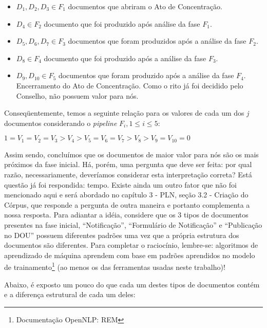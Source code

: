 \documentclass[11pt]{report}
\newcommand{\quotes}[1]{``#1''}
\begin{document}
\begin{itemize}
  \item $D_1, D_2, D_3 \in F_1$ documentos que abriram o Ato de Concentração.
  \item $D_4 \in F_2$ documento que foi produzido após análise da fase $F_1$.
  \item $D_5, D_6, D_7 \in F_3$ documentos que foram produzidos após a análise da fase $F_2$.
  \item $D_8 \in F_4$ documento que foi produzido após a análise da fase $F_3$.
  \item $D_9, D_{10} \in F_5$ documentos que foram produzido após a análise da fase $F_4$. Encerramento do Ato de Concentração. Como o rito já foi decidido pelo Conselho,
  não possuem valor para nós.
\end{itemize}

Conseqüentemente, temos a seguinte relação para os valores de cada um dos \textit{j} documentos considerando o \textit{pipeline} $F_i, 1 \leq i \leq 5$:
\begin{center}
  $1 = V_1 = V_2 = V_3 > V_4 > V_5 = V_6 = V_7 > V_8 > V_9 = V_{10} = 0$
\end{center}

Assim sendo, concluímos que os documentos de maior valor para nós são os mais próximos da fase inicial. Há, porém, uma pergunta que deve ser feita: por qual razão,
necessariamente, deveríamos considerar esta interpretação correta? Está questão já foi respondida: tempo. Existe ainda um outro fator que não foi mencionado aqui e será abordado
no capítulo 3 - PLN, seção 3.2 - Criação do Córpus, que responde a pergunta de outra maneira e portanto complementa a nossa resposta. Para adiantar a idéia, considere que os 3 tipos de
documentos presentes na fase inicial, \quotes{Notificação}, \quotes{Formulário de Notificação} e \quotes{Publicação no DOU} possuem diferentes padrões uma vez que a própria
estrutura dos documentos são diferentes. Para completar o raciocínio, lembre-se: algoritmos de aprendizado de máquina aprendem com base em padrões aprendidos no modelo
de trainamento\footnote[6]{Documentação OpenNLP: REM} (ao menos os das ferramentas usadas neste trabalho)!

Abaixo, é exposto um pouco do que cada um destes tipos de documentos contém e a diferença estrutural de cada um deles:
\end{document}
